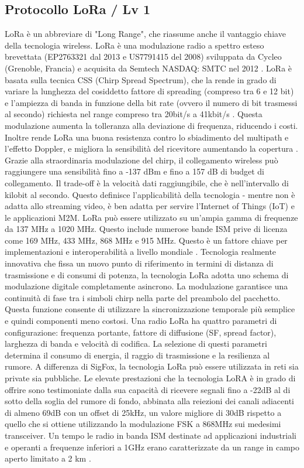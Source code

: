 \documentclass[a4paper]{report} %
\begin{document}
\subsection{Protocollo LoRa / Lv 1}
LoRa è un abbreviare di "Long Range", che riassume anche il vantaggio chiave della tecnologia wireless. LoRa è una modulazione radio a spettro esteso brevettata (EP2763321 dal 2013 e US7791415 del 2008) sviluppata da Cycleo (Grenoble, Francia) e acquisita da Semtech NASDAQ: SMTC nel 2012 \cite{art:rif.30}. 
LoRa è basata sulla tecnica CSS (Chirp Spread Spectrum), che la rende in grado di variare la lunghezza del cosiddetto fattore di spreading (compreso tra 6 e 12 bit) e l'ampiezza di banda in funzione della bit rate (ovvero il numero di bit trasmessi al secondo) richiesta nel range compreso tra 20bit/s a 41kbit/s \cite{art:rif.23}. 
Questa modulazione aumenta la tolleranza alla deviazione di frequenza, riducendo i costi. Inoltre rende LoRa una buona resistenza contro lo sbiadimento del multipath e l'effetto Doppler, e migliora la sensibilità del ricevitore aumentando la copertura \cite{art:rif.44}. 
Grazie alla straordinaria modulazione del chirp, il collegamento wireless può raggiungere una sensibilità fino a -137 dBm e fino a 157 dB di budget di collegamento. Il trade-off è la velocità dati raggiungibile, che è nell'intervallo di kilobit al secondo. Questo definisce l'applicabilità della tecnologia - mentre non è adatta allo streaming video, è ben adatta per servire l'Internet of Things (IoT) e le applicazioni M2M. LoRa può essere utilizzato su un'ampia gamma di frequenze da 137 MHz a 1020 MHz. Questo include numerose bande ISM prive di licenza come 169 MHz, 433 MHz, 868 MHz e 915 MHz. Questo è un fattore chiave per implementazioni e interoperabilità a livello mondiale \cite{art:rif.30}. 
Tecnologia realmente innovativa che fissa un nuovo punto di riferimento in termini di distanza di trasmissione e di consumi di potenza, la tecnologia LoRa adotta uno schema di modulazione digitale completamente asincrono. La modulazione garantisce una continuità di fase tra i simboli chirp nella parte del preambolo del pacchetto. Questa funzione consente di utilizzare la sincronizzazione temporale più semplice e quindi componenti meno costosi. Una radio LoRa ha quattro parametri di configurazione: frequenza portante, fattore di diffusione (SF, spread factor), larghezza di banda e velocità di codifica. La selezione di questi parametri determina il consumo di energia, il raggio di trasmissione e la resilienza al rumore. A differenza di SigFox, la tecnologia LoRa può essere utilizzata in reti sia private sia pubbliche. Le elevate prestazioni che la tecnologia LoRA è in grado di offrire sono testimoniate dalla sua capacità di ricevere segnali fino a -22dB al di sotto della soglia del rumore di fondo, abbinata alla reiezioni dei canali adiacenti di almeno 69dB con un offset di 25kHz, un valore migliore di 30dB rispetto a quello che si ottiene utilizzando la modulazione FSK a 868MHz sui medesimi transceiver. Un tempo le radio in banda ISM destinate ad applicazioni industriali e operanti a frequenze inferiori a 1GHz erano caratterizzate da un range in campo aperto limitato a 2 km \cite{art:rif.23}. 
\end{document}
